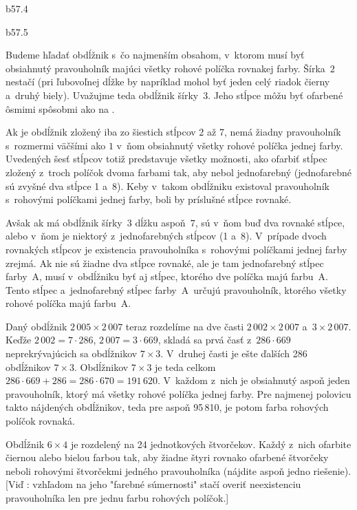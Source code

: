 {%
\epsplace b57.4 \hfil\Obr\par
\ifrocenka\else\epsplace b57.5 \hfil\Obr\par\fi
Budeme hľadať obdĺžnik s~čo najmenším obsahom,
v~ktorom musí byť obsiahnutý pravouholník majúci všetky rohové
políčka rovnakej farby. Šírka~$2$ nestačí (pri ľubovoľnej dĺžke by
napríklad mohol byť jeden celý riadok čierny a~druhý biely). Uvažujme
teda obdĺžnik šírky~$3$. Jeho stĺpce môžu byť ofarbené ôsmimi
spôsobmi ako na \obr.

\inspicture{}

Ak je obdĺžnik zložený iba zo šiestich stĺpcov 2 až 7, nemá žiadny pravouholník
s~rozmermi väčšími ako $1$ v~ňom obsiahnutý všetky rohové políčka
jednej farby. Uvedených šesť stĺpcov totiž predstavuje všetky
možnosti, ako ofarbiť stĺpec zložený z~troch políčok dvoma
farbami tak, aby nebol jednofarebný (jednofarebné sú zvyšné
dva stĺpce 1 a~8). Keby v~takom obdĺžniku existoval pravouholník
s~rohovými políčkami jednej farby, boli by príslušné
stĺpce rovnaké.

Avšak ak má obdĺžnik šírky~$3$ dĺžku aspoň~$7$, sú v~ňom buď dva
rovnaké stĺpce, alebo v~ňom je niektorý z~jednofarebných stĺpcov (1
a~8). V~prípade dvoch rovnakých stĺpcov je existencia pravouholníka
s~rohovými políčkami jednej farby zrejmá. Ak nie sú žiadne dva
stĺpce rovnaké, ale je tam jednofarebný stĺpec farby~A, musí
v~obdĺžniku byť aj stĺpec, ktorého dve políčka majú farbu~A. Tento
stĺpec a~jednofarebný stĺpec farby~A~určujú pravouholník,
ktorého všetky rohové políčka majú farbu~A.

Daný obdĺžnik $2\,005\times2\,007$ teraz rozdelíme na dve časti
$2\,002\times2\,007$ a~$3\times2\,007$.
Keďže $2\,002=7\cdot286$, $2\,007=3\cdot669$, skladá sa prvá časť
z~$286\cdot669$ neprekrývajúcich sa obdĺžnikov
$7\times3$. V~druhej časti je ešte ďalších
286 obdĺžnikov $7\times3$. Obdĺžnikov $7\times3$ je teda celkom
$286\cdot669+286=286\cdot670=191\,620$. V~každom z~nich je obsiahnutý
aspoň jeden pravouholník, ktorý má všetky rohové políčka jednej
farby. Pre najmenej polovicu takto nájdených obdĺžnikov, teda
pre aspoň 95\,810, je potom farba rohových políčok rovnaká.

Obdĺžnik $6\times4$ je rozdelený na 24 jednotkových štvorčekov.
Každý z~nich ofarbite čiernou alebo bielou farbou tak, aby žiadne
štyri rovnako ofarbené štvorčeky neboli rohovými štvorčekmi jedného
pravouholníka (nájdite aspoň jedno riešenie).
[Viď \obr: vzhľadom na jeho "farebné súmernosti" stačí
overiť neexistenciu pravouholníka len pre jednu farbu rohových
políčok.]
\inspicture{}

}
